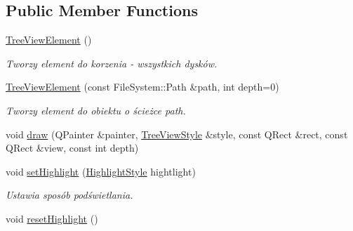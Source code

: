 \subsection*{Public Member Functions}
\begin{DoxyCompactItemize}
\item 
\hypertarget{class_tree_view_element_a0c6ab013ce3603e8b6989f74ed7d0d88}{
\hyperlink{class_tree_view_element_a0c6ab013ce3603e8b6989f74ed7d0d88}{TreeViewElement} ()}
\label{class_tree_view_element_a0c6ab013ce3603e8b6989f74ed7d0d88}

\begin{DoxyCompactList}\small\item\em Tworzy element do korzenia -\/ wszystkich dysków. \item\end{DoxyCompactList}\item 
\hypertarget{class_tree_view_element_a0a8c5e5bdc31b1623e454d429083ffd6}{
\hyperlink{class_tree_view_element_a0a8c5e5bdc31b1623e454d429083ffd6}{TreeViewElement} (const FileSystem::Path \&path, int depth=0)}
\label{class_tree_view_element_a0a8c5e5bdc31b1623e454d429083ffd6}

\begin{DoxyCompactList}\small\item\em Tworzy element do obiektu o ścieżce path. \item\end{DoxyCompactList}\item 
void \hyperlink{class_tree_view_element_abfc0297da8320d17fcf9876f1935167c}{draw} (QPainter \&painter, \hyperlink{class_tree_view_style}{TreeViewStyle} \&style, const QRect \&rect, const QRect \&view, const int depth)
\item 
\hypertarget{class_tree_view_element_af19b1a190604e2152f255955d3ff31d4}{
void \hyperlink{class_tree_view_element_af19b1a190604e2152f255955d3ff31d4}{setHighlight} (\hyperlink{class_tree_view_element_a5253fdcb86d28b2545214d4d5e47af2c}{HighlightStyle} hightlight)}
\label{class_tree_view_element_af19b1a190604e2152f255955d3ff31d4}

\begin{DoxyCompactList}\small\item\em Ustawia sposób podświetlania. \item\end{DoxyCompactList}\item 
\hypertarget{class_tree_view_element_aebb598264309c8ca12e85a32b9efac4c}{
void \hyperlink{class_tree_view_element_aebb598264309c8ca12e85a32b9efac4c}{resetHighlight} ()}
\label{class_tree_view_element_aebb598264309c8ca12e85a32b9efac4c}


\end{DoxyCompactItemize}

